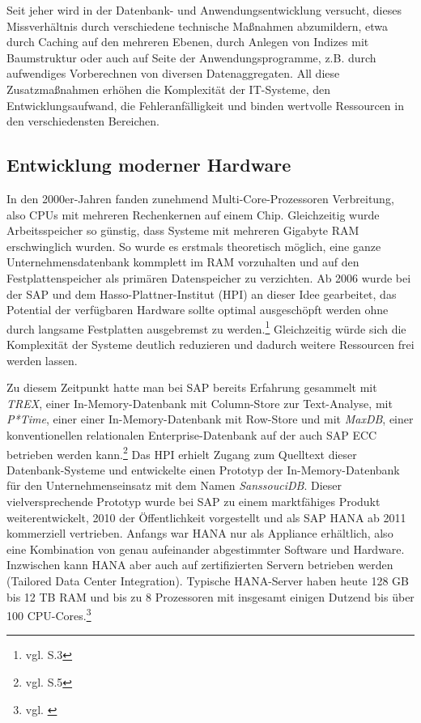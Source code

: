 Seit jeher wird in der Datenbank- und Anwendungsentwicklung versucht, dieses 
Missverhältnis durch verschiedene technische Maßnahmen abzumildern, etwa durch 
Caching auf den mehreren Ebenen, durch Anlegen von Indizes mit Baumstruktur oder
auch auf Seite der Anwendungsprogramme, z.B. durch aufwendiges Vorberechnen von diversen Datenaggregaten.
All diese Zusatzmaßnahmen erhöhen die Komplexität der IT-Systeme, den Entwicklungsaufwand,
die Fehleranfälligkeit und binden wertvolle Ressourcen in den verschiedensten Bereichen.

\subsection{Entwicklung moderner Hardware}
In den 2000er-Jahren fanden zunehmend Multi-Core-Prozessoren Verbreitung, also 
CPUs mit mehreren Rechenkernen auf einem Chip. Gleichzeitig wurde Arbeitsspeicher
so günstig, dass Systeme mit mehreren Gigabyte RAM erschwinglich wurden.
So wurde es erstmals theoretisch möglich, eine ganze Unternehmensdatenbank
kommplett im RAM vorzuhalten und auf den Festplattenspeicher als primären
Datenspeicher zu verzichten. Ab 2006 wurde bei der SAP und dem Hasso-Plattner-Institut (HPI) an
dieser Idee gearbeitet, das Potential der verfügbaren Hardware sollte optimal ausgeschöpft
werden ohne durch langsame Festplatten ausgebremst zu werden.\footnote{vgl. \cite{Plattner2015} S.3} Gleichzeitig
würde sich die Komplexität der Systeme deutlich reduzieren und dadurch weitere
Ressourcen frei werden lassen.

Zu diesem Zeitpunkt hatte man bei SAP bereits 
Erfahrung gesammelt mit \textit{TREX}, einer In-Memory-Datenbank mit Column-Store zur Text-Analyse, 
mit \textit{P*Time}, einer einer In-Memory-Datenbank mit Row-Store und mit \textit{MaxDB}, einer
konventionellen relationalen Enterprise-Datenbank auf der auch SAP ECC betrieben werden kann.\footnote{vgl. \cite{Plattner2015} S.5}
Das HPI erhielt Zugang zum Quelltext dieser Datenbank-Systeme und entwickelte einen 
Prototyp der In-Memory-Datenbank für den Unternehmenseinsatz mit dem Namen \textit{SanssouciDB}.
Dieser vielversprechende Prototyp wurde bei SAP zu einem marktfähiges Produkt 
weiterentwickelt, 2010 der Öffentlichkeit vorgestellt und als SAP HANA
ab 2011 kommerziell vertrieben. Anfangs war HANA nur als Appliance erhältlich, 
also eine Kombination von genau aufeinander abgestimmter Software und Hardware.
Inzwischen kann HANA aber auch auf zertifizierten Servern betrieben werden 
(Tailored Data Center Integration). 
Typische HANA-Server haben heute 128 GB bis 12 TB RAM und bis zu 8 Prozessoren mit insgesamt 
einigen Dutzend bis über 100 CPU-Cores.\footnote{vgl. \cite{SAP2016}}

